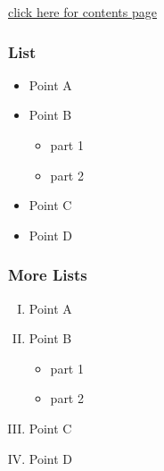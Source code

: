 \documentclass{beamer}
\begin{document}
\begin{frame}
\hyperlink{contents}{click here for contents page}

\hyperlink{contents}{}
\hyperlink{contents}{}
\hyperlink{contents}{}
\hyperlink{contents}{}
\end{frame}

\begin{frame}
\frametitle{List}
\begin{itemize}
\pause
\item Point A
\pause
\item Point B
\begin{itemize}
\pause
\item part 1
\pause
\item part 2
\end{itemize}
\pause
\item Point C
\pause
\item Point D
\end{itemize}
\end{frame}

\begin{frame}
\frametitle{More Lists}
\begin{enumerate}[(I)]
\item<1-> Point A
\item<2-> Point B
\begin{itemize}
\item<3-> part 1
\item<4-> part 2
\end{itemize}
\item<5-> Point C
\item<6-> Point D
\end{enumerate}
\end{frame}
\end{document}
